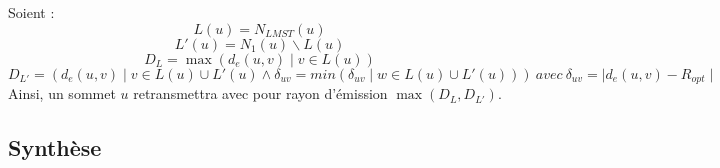 Soient : 
$$L(u)= N_{LMST}(u)$$
$$L'(u)=N_1(u)\backslash L(u)$$
$$D_L=\max(d_e(u,v)\mid v \in L(u))$$
$$D_{L'}=(d_e(u,v)\mid v \in L(u)\cup L'(u)\wedge \delta_{uv}=min(\delta_{uv}\mid w \in L(u)\cup L'(u)))\ avec\ \delta_{uv}=\mid d_e(u,v)-R_{opt}\mid$$
Ainsi, un sommet $u$ retransmettra avec pour rayon d'émission $\max(D_L,D_{L'})$.


\subsection{Synthèse}


